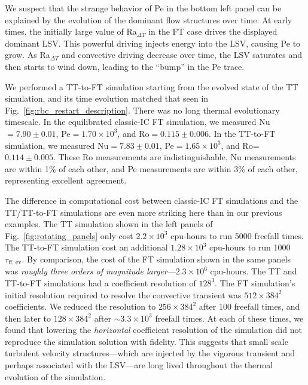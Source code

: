 \documentclass[aps, pre, onecolumn, nofootinbib, notitlepage, groupedaddress, amsfonts, amssymb, amsmath, longbibliography, superscriptaddress]{revtex4-1}
\begin{document}
We suspect that the strange behavior of Pe in the bottom left panel can be explained by the evolution of the dominant flow structures over time.
At early times, the initially large value of Ra$_{\Delta T}$ in the FT case drives the displayed dominant LSV.
This powerful driving injects energy into the LSV, causing Pe to grow.
As Ra$_{\Delta T}$ and convective driving decrease over time, the LSV saturates and then starts to wind down, leading to the ``bump'' in the Pe trace.

We performed a TT-to-FT simulation starting from the evolved state of the TT simulation, and its time evolution matched that seen in Fig.~\ref{fig:rbc_restart_description}.
There was no long thermal evolutionary timescale.
In the equilibrated classic-IC FT simulation, we measured Nu$=7.90 \pm 0.01$, Pe$=1.70 \times 10^3$, and Ro$=0.115 \pm 0.006$.
In the TT-to-FT simulation, we measured Nu$=7.83 \pm 0.01$, Pe$=1.65 \times 10^3$, and Ro=$0.114 \pm 0.005$.
These Ro measurements are indistinguishable, Nu measurements are within 1\% of each other, and Pe measurements are within 3\% of each other, representing excellent agreement.

The difference in computational cost between classic-IC FT simulations and the TT/TT-to-FT simulations are even more striking here than in our previous examples.
The TT simulation shown in the left panels of Fig.~\ref{fig:rotating_panels} only cost $2.2 \times 10^3$ cpu-hours to run 5000 freefall times.
The TT-to-FT simulation cost an additional $1.28 \times 10^3$ cpu-hours to run 1000$\tau_{\text{ff, ev}}$.
By comparison, the cost of the FT simulation shown in the same panels was \emph{roughly three orders of magnitude larger}---$2.3 \times 10^6$ cpu-hours.
The TT and TT-to-FT simulations had a coefficient resolution of $128^3$.
The FT simulation's initial resolution required to resolve the convective transient was $512\times384^2$ coefficients.
We reduced the resolution to $256\times384^2$ after 100 freefall times, and then later to $128\times384^2$ after $\sim3.3 \times 10^3$ freefall times.
At each of these times, we found that lowering the \emph{horizontal} coefficient resolution of the simulation did not reproduce the simulation solution with fidelity.
This suggests that small scale turbulent velocity structures---which are injected by the vigorous transient and perhaps associated with the LSV---are long lived throughout the thermal evolution of the simulation.




\end{document}
